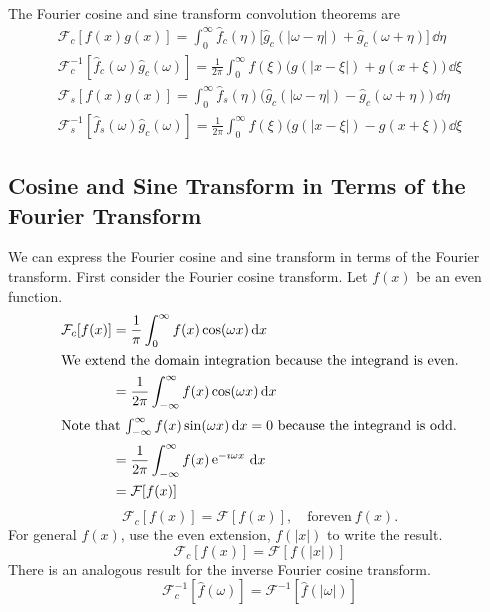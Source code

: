 \begin{Result}
  The Fourier cosine and sine transform convolution theorems are
  \begin{gather*}
    \mathcal{F}_c[f(x) g(x)] = \int_0^\infty \hat{f}_c(\eta) \big[\hat{g}_c(|\omega-\eta|) 
    + \hat{g}_c(\omega+\eta)\big]\,\dd \eta 
    \\
    \mathcal{F}_c^{-1}[\hat{f}_c(\omega) \hat{g}_c(\omega)] 
    = \frac{1}{2\pi}\int_0^\infty f(\xi) \big( g(|x-\xi|) + g(x+\xi) \big) \,\dd \xi 
    \\
    \mathcal{F}_s[f(x)g(x)] = \int_0^\infty \hat{f}_s(\eta) \big( \hat{g}_c(|\omega-\eta|)
    - \hat{g}_c(\omega+\eta)\big) \,\dd \eta 
    \\
    \mathcal{F}_s^{-1}[\hat{f}_s(\omega) \hat{g}_c(\omega)] 
    = \frac{1}{2\pi} \int_0^\infty f(\xi) \big( g(|x-\xi|) - g(x+\xi)\big) \,\dd \xi
  \end{gather*}
\end{Result}







\subsection{Cosine and Sine Transform in Terms of the Fourier Transform}


We can express the Fourier cosine and sine transform in terms of the 
Fourier transform.  First consider the Fourier cosine transform.  Let $f(x)$
be an even function.
\begin{align*}
  \mathcal{F}_c[f(x)] &= \frac{1}{\pi} \int_0^\infty f(x) \cos(\omega x) \,\mathrm{d} x 
  \\
  \intertext{We extend the domain integration because the integrand is even.}
  &= \frac{1}{2 \pi} \int_{-\infty}^\infty f(x) \cos(\omega x) \,\mathrm{d} x 
  \\
  \intertext{Note that $\int_{-\infty}^\infty f(x) \sin(\omega x)\,\mathrm{d} x = 0$ because the 
    integrand is odd.}
  &= \frac{1}{2 \pi} \int_{-\infty}^\infty f(x) \mathop{\mathrm{e}}\nolimits^{-\imath \omega x} \,\mathrm{d} x 
  \\
  &= \mathcal{F}[f(x)]
\end{align*}
\[
\mathcal{F}_c[f(x)] = \mathcal{F}[f(x)], \quad \mathrm{for even}\ f(x).
\]
For general $f(x)$, use the even extension, $f(|x|)$ to write the result.
\[
\mathcal{F}_c[f(x)] = \mathcal{F}[f(|x|)]
\]
There is an analogous result for the inverse Fourier cosine transform.
\[
\mathcal{F}_c^{-1} \left[ \hat{f}(\omega) \right] 
= \mathcal{F}^{-1} \left[ \hat{f}(|\omega|) \right]
\]

